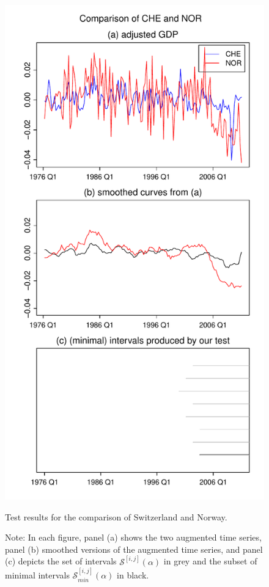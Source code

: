 \documentclass[a4paper,12pt]{article}
\begin{document}
{\begin{figure}[p!]
\begin{minipage}[t]{0.49\textwidth}
\includegraphics[width=\textwidth]{plots/CHE_vs_NOR}
\caption{Test results for the comparison of Switzerland and Norway.}\label{fig:Switzerland:Norway}
\end{minipage}

\caption*{Note: In each figure, panel (a) shows the two augmented time series, panel (b) smoothed versions of the augmented time series, and panel (c) depicts the set of intervals $\mathcal{S}^{[i,j]}(\alpha)$ in grey and the subset of minimal intervals $\mathcal{S}^{[i,j]}_{min}(\alpha)$ in black.}
\end{figure}

}
\end{document}
